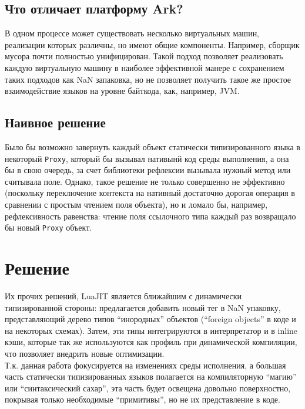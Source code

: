 \documentclass[times,specification,annotation]{itmo-student-thesis}
\begin{document}
\finishrelatedwork

\section{Что отличает платформу Ark?}
В одном процессе может существовать несколько виртуальных машин, реализации которых различны, но имеют общие компоненты. Например, сборщик мусора почти полностью унифицирован. Такой подход позволяет реализовать каждую виртуальную машину в наиболее эффективной манере с сохранением таких подходов как NaN запаковка, но не позволяет получить такое же простое взаимодействие языков на уровне байткода, как, например, JVM.

\section{Наивное решение}
Было бы возможно завернуть каждый объект статически типизированного языка в некоторый \texttt{Proxy}, который бы вызывал нативынй код среды выполнения, а она бы в свою очередь, за счет библиотеки рефлексии вызывала нужный метод или считывала поле. Однако, такое решение не только совершенно не эффективно (поскольку переключение контекста на нативный достаточно дорогая операция в сравнении с простым чтением поля объекта), но и ломало бы, например, рефлексивность равенства: чтение поля ссылочного типа каждый раз возвращало бы новый \texttt{Proxy} объект.

\chapter{Решение}
Их прочих решений, LuaJIT является ближайшим с динамически типизированной стороны: предлагается добавить новый тег в NaN упаковку, представляющий дерево типов ``инородных'' объектов (``foreign objects'' в коде и на некоторых схемах). Затем, эти типы интегрируются в интерпретатор и в inline кэши, которые так же используются как профиль при динамической компиляции, что позволяет внедрить новые оптимизации.\\
Т.к. данная работа фокусируется на изменениях среды исполнения, а большая часть статически типизированных языков полагается на компиляторную ``магию'' или ``синтаксический сахар'', эта часть будет освещена довольно поверхностно, покрывая только необходимые ``примитивы'', но не их представление в коде.
\end{document}
